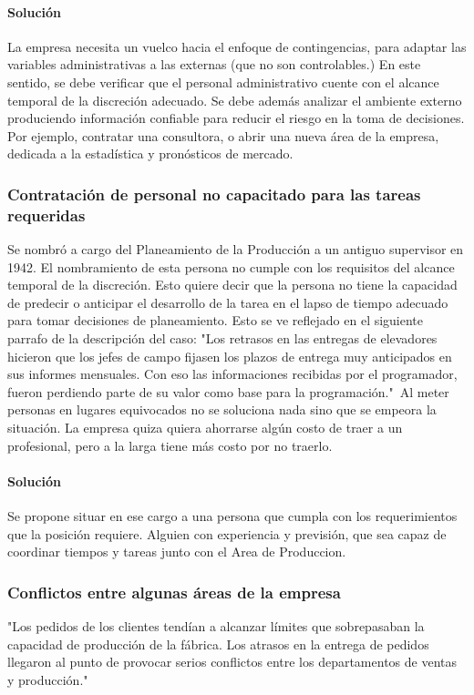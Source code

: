 \paragraph{Soluci\'on}
La empresa necesita un vuelco hacia el enfoque de contingencias, para adaptar las variables administrativas a las externas (que no son controlables.) En este sentido, se debe verificar que el personal administrativo cuente con el alcance temporal de la discreci\'on adecuado. Se debe adem\'{a}s analizar el ambiente externo produciendo informaci\'on confiable para reducir el riesgo en la toma de decisiones. Por ejemplo, contratar una consultora, o abrir una nueva \'area de la empresa, dedicada a la estad\'istica y pron\'osticos de mercado.

\subsubsection{Contrataci\'on de personal no capacitado para las tareas requeridas}
Se nombr\'o a cargo del Planeamiento de la Producci\'on a un antiguo supervisor en 1942. El nombramiento de esta persona no cumple con los requisitos del alcance temporal de la discreci\'on. Esto quiere decir que la persona no tiene la capacidad de predecir o anticipar el desarrollo de la tarea en el lapso de tiempo adecuado para tomar decisiones de planeamiento. Esto se ve reflejado en el siguiente parrafo de la descripci\'on del caso: "Los retrasos en las entregas de elevadores hicieron que los jefes de campo fijasen los plazos de entrega muy anticipados en sus informes mensuales. Con eso las informaciones recibidas por el programador, fueron perdiendo parte de su valor como base para la programaci\'on."\ Al meter personas en lugares equivocados no se soluciona nada sino que se empeora la situaci\'on. La empresa quiza quiera ahorrarse alg\'un costo de traer a un profesional, pero a la larga tiene m\'as costo por no traerlo.
\paragraph{Soluci\'on}
Se propone situar en ese cargo a una persona que cumpla con los requerimientos que la posici\'on requiere. Alguien con experiencia y previsi\'on, que sea capaz de coordinar tiempos y tareas junto con el Area de Produccion.

\subsubsection{Conflictos entre algunas \'areas de la empresa}
"Los pedidos de los clientes tend\'ian a alcanzar l\'imites que sobrepasaban la capacidad de producci\'on de la f\'abrica. Los atrasos en la entrega de pedidos llegaron al punto de provocar serios conflictos entre los departamentos de ventas y producci\'on."
